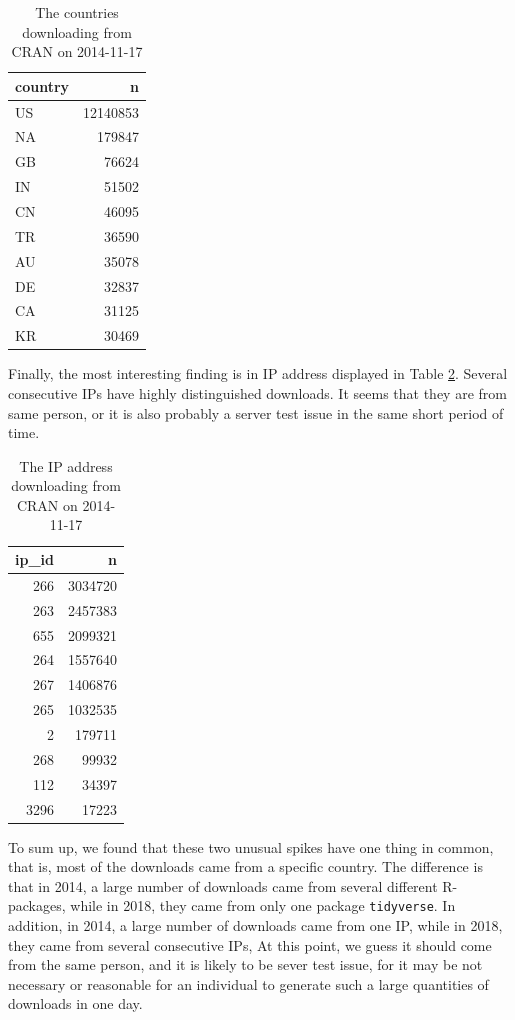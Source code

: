 \documentclass[
]{book}
\begin{document}
\begin{table}

\caption{\label{tab:spike18country}The countries downloading from CRAN on 2014-11-17}
\centering
\begin{tabular}[t]{l|r}
\hline
country & n\\
\hline
US & 12140853\\
\hline
NA & 179847\\
\hline
GB & 76624\\
\hline
IN & 51502\\
\hline
CN & 46095\\
\hline
TR & 36590\\
\hline
AU & 35078\\
\hline
DE & 32837\\
\hline
CA & 31125\\
\hline
KR & 30469\\
\hline
\end{tabular}
\end{table}

Finally, the most interesting finding is in IP address displayed in Table \ref{tab:spike18ip}. Several consecutive IPs have highly distinguished downloads. It seems that they are from same person, or it is also probably a server test issue in the same short period of time.

\begin{table}

\caption{\label{tab:spike18ip}The IP address downloading from CRAN on 2014-11-17}
\centering
\begin{tabular}[t]{r|r}
\hline
ip\_id & n\\
\hline
266 & 3034720\\
\hline
263 & 2457383\\
\hline
655 & 2099321\\
\hline
264 & 1557640\\
\hline
267 & 1406876\\
\hline
265 & 1032535\\
\hline
2 & 179711\\
\hline
268 & 99932\\
\hline
112 & 34397\\
\hline
3296 & 17223\\
\hline
\end{tabular}
\end{table}

To sum up, we found that these two unusual spikes have one thing in common, that is, most of the downloads came from a specific country. The difference is that in 2014, a large number of downloads came from several different R-packages, while in 2018, they came from only one package \texttt{tidyverse}. In addition, in 2014, a large number of downloads came from one IP, while in 2018, they came from several consecutive IPs, At this point, we guess it should come from the same person, and it is likely to be sever test issue, for it may be not necessary or reasonable for an individual to generate such a large quantities of downloads in one day.
\end{document}
